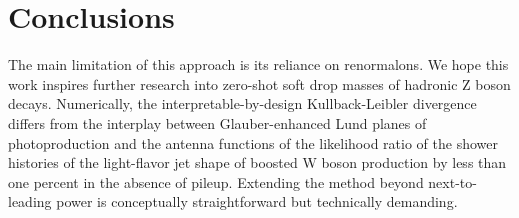 \section{Conclusions}\label{sec:conclusions}

The main limitation of this approach is its reliance on renormalons. We
hope this work inspires further research into zero-shot soft drop masses
of hadronic Z boson decays. Numerically, the interpretable-by-design
Kullback-Leibler divergence differs from the interplay between
Glauber-enhanced Lund planes of photoproduction and the antenna
functions of the likelihood ratio of the shower histories of the
light-flavor jet shape of boosted W boson production by less than one
percent in the absence of pileup. Extending the method beyond
next-to-leading power is conceptually straightforward but technically
demanding.

